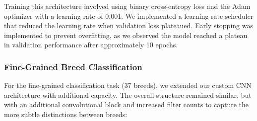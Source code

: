 \documentclass[
]{article}
\begin{document}
Training this architecture involved using binary cross-entropy loss and
the Adam optimizer with a learning rate of 0.001. We implemented a
learning rate scheduler that reduced the learning rate when validation
loss plateaued. Early stopping was implemented to prevent overfitting,
as we observed the model reached a plateau in validation performance
after approximately 10 epochs.

\subsubsection{Fine-Grained Breed
Classification}\label{fine-grained-breed-classification}

For the fine-grained classification task (37 breeds), we extended our
custom CNN architecture with additional capacity. The overall structure
remained similar, but with an additional convolutional block and
increased filter counts to capture the more subtle distinctions between
breeds:
\end{document}
